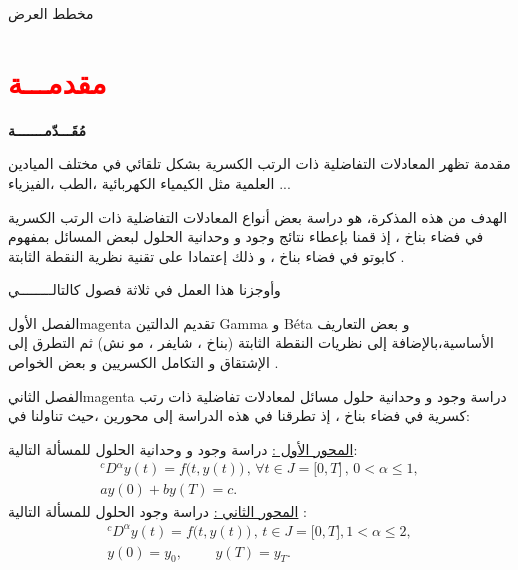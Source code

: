 \documentclass[dvipsnames,mathserif]{beamer}
\begin{document}
\begin{frame}{ مخطط العرض}
\tableofcontents
\end{frame}

\section{\textcolor{red}{مقدمـــة}}

\begin{frame}[plain]{{\Large{ \textbf{{مُقَـــدّمـــــــة}}}}}\transsplitverticalout
\begin{paperbox}{مقدمة}
 تظهر المعادلات التفاضلية ذات الرتب الكسرية بشكل تلقائي في مختلف الميادين العلمية مثل الكيمياء الكهربائية ،الطب ،الفيزياء ... 
 
 الهدف من هذه المذكرة، هو دراسة بعض أنواع المعادلات التفاضلية ذات الرتب الكسرية في فضاء بناخ ، إذ قمنا بإعطاء نتائج وجود و وحدانية الحلول لبعض المسائل بمفهوم كابوتو في فضاء بناخ ، و ذلك إعتمادا على تقنية نظرية النقطة الثابتة .

وأوجزنا هذا العمل في ثلاثة فصول كالتالــــــــي
\end{paperbox}
\end{frame}
\begin{frame}
\begin{ambox}{الفصل الأول}{magenta}
 تقديم الدالتين  Gamma و Béta و بعض التعاريف الأساسية،بالإضافة إلى نظريات النقطة الثابتة (بناخ ، شايفر ، مو نش) ثم التطرق إلى الإشتقاق و التكامل الكسريين و بعض الخواص .
\end{ambox}
\end{frame}
\begin{frame}
\begin{ambox}{الفصل الثاني}{magenta}
 دراسة وجود و وحدانية حلول مسائل لمعادلات تفاضلية ذات رتب  كسرية  في فضاء بناخ ،
إذ تطرقنا في هذه الدراسة إلى محورين ،حيث تناولنا في:
\begin{tcolorbox}[enhanced,title=\,,
frame style tile={width=1cm}{pink_marble.png}]
{\LARGE{}}
\underline{المحور الأول :}
دراسة وجود و وحدانية الحلول للمسألة التالية:
\begin{align*}
{}^{c}D{}^{\alpha }y(t)=f\big(t,y(t)\big)\,,\,\forall t\in J=\big[0,T\big]\,,\,0<\alpha \le 1 , \\
ay(0)+by(T)=c. \hspace{3cm} \,
\end{align*}
\tcblower
{\LARGE{}}
\underline{المحور الثاني :}
دراسة وجود الحلول للمسألة التالية :
\begin{align*}
{}^c{D^\alpha }y(t) = f\big(t,y(t)\big)\,,\,t \in J = \big[ {0,T} \big],1 < \alpha  \le 2 ,\\
y(0) = y_{0},\,\,\,\,\,\,\,\,\,\,\,\,\,\,y(T) = y_{T}.\hspace{2cm} \,
\end{align*}
\end{tcolorbox}
\end{ambox}
\end{frame}
\end{document}
